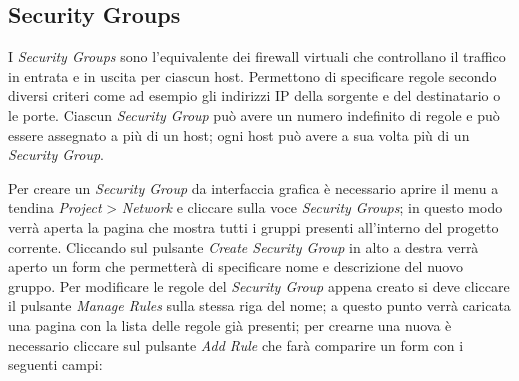 \subsection{Security Groups}

I \textit{Security Groups} sono l'equivalente dei firewall virtuali che controllano il traffico in entrata e in uscita per ciascun host. Permettono di specificare regole secondo diversi criteri come ad esempio gli indirizzi IP della sorgente e del destinatario o le porte. Ciascun \textit{Security Group} può avere un numero indefinito di regole e può essere assegnato a più di un host; ogni host può avere a sua volta più di un \textit{Security Group}.

Per creare un \textit{Security Group} da interfaccia grafica è necessario aprire il menu a tendina \textit{Project} > \textit{Network} e cliccare sulla voce \textit{Security Groups}; in questo modo verrà aperta la pagina che mostra tutti i gruppi presenti all'interno del progetto corrente. Cliccando sul pulsante \textit{Create Security Group} in alto a destra verrà aperto un form che permetterà di specificare nome e descrizione del nuovo gruppo. Per modificare le regole del \textit{Security Group} appena creato si deve cliccare il pulsante \textit{Manage Rules} sulla stessa riga del nome; a questo punto verrà caricata una pagina con la lista delle regole già presenti; per crearne una nuova è necessario cliccare sul pulsante \textit{Add Rule} che farà comparire un form con i seguenti campi:
